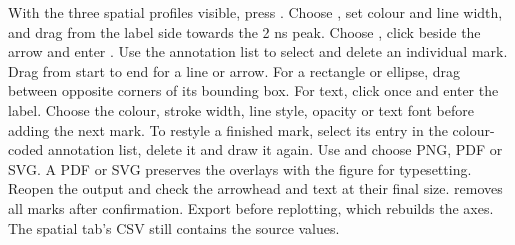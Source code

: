 With the three spatial profiles visible, press . Choose , set colour and line width, and drag from the label side towards the 2 ns peak. Choose , click beside the arrow and enter . Use the annotation list to select and delete an individual mark.
Drag from start to end for a line or arrow. For a rectangle or ellipse, drag between opposite corners of its bounding box. For text, click once and enter the label. Choose the colour, stroke width, line style, opacity or text font before adding the next mark. To restyle a finished mark, select its entry in the colour-coded annotation list, delete it and draw it again.
Use  and choose PNG, PDF or SVG. A PDF or SVG preserves the overlays with the figure for typesetting. Reopen the output and check the arrowhead and text at their final size.  removes all marks after confirmation. Export before replotting, which rebuilds the axes. The spatial tab's CSV still contains the source values.




